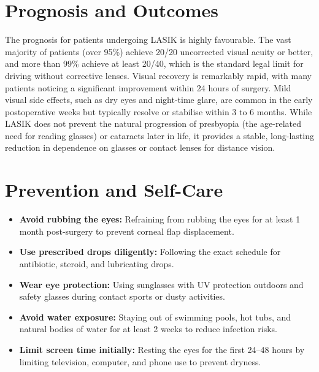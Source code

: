 \section*{Prognosis and Outcomes}
The prognosis for patients undergoing LASIK is highly favourable. The vast majority of patients (over 95\%) achieve 20/20 uncorrected visual acuity or better, and more than 99\% achieve at least 20/40, which is the standard legal limit for driving without corrective lenses. Visual recovery is remarkably rapid, with many patients noticing a significant improvement within 24 hours of surgery. Mild visual side effects, such as dry eyes and night-time glare, are common in the early postoperative weeks but typically resolve or stabilise within 3 to 6 months. While LASIK does not prevent the natural progression of presbyopia (the age-related need for reading glasses) or cataracts later in life, it provides a stable, long-lasting reduction in dependence on glasses or contact lenses for distance vision.

\section*{Prevention and Self-Care}
\begin{itemize}
    \item \textbf{Avoid rubbing the eyes:} Refraining from rubbing the eyes for at least 1 month post-surgery to prevent corneal flap displacement.
    \item \textbf{Use prescribed drops diligently:} Following the exact schedule for antibiotic, steroid, and lubricating drops.
    \item \textbf{Wear eye protection:} Using sunglasses with UV protection outdoors and safety glasses during contact sports or dusty activities.
    \item \textbf{Avoid water exposure:} Staying out of swimming pools, hot tubs, and natural bodies of water for at least 2 weeks to reduce infection risks.
    \item \textbf{Limit screen time initially:} Resting the eyes for the first 24--48 hours by limiting television, computer, and phone use to prevent dryness.
\end{itemize}

